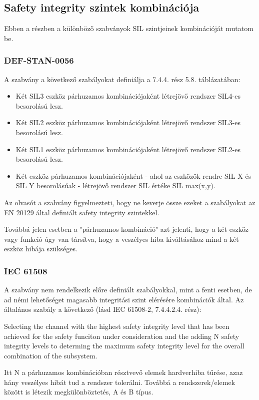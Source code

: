 \subsection{Safety integrity szintek kombinációja}
Ebben a részben a különböző szabványok SIL szintjeinek kombinációját mutatom be.

\subsubsection{DEF-STAN-0056}
A szabvány a következő szabályokat definiálja a 7.4.4. rész 5.8. táblázatában:
\begin{itemize}
	\item Két SIL3 eszköz párhuzamos kombinációjaként létrejövő rendszer SIL4-es besorolású lesz.
	\item Két SIL2 eszköz párhuzamos kombinációjaként létrejövő rendszer SIL3-es besorolású lesz.
	\item Két SIL1 eszköz párhuzamos kombinációjaként létrejövő rendszer SIL2-es besorolású lesz.
	\item Két eszköz párhuzamos kombinációjaként - ahol az eszközök rendre SIL X és SIL Y besorolásúak - létrejövő rendszer SIL értéke SIL max(x,y).
\end{itemize}

Az olvasót a szabvány figyelmezteti, hogy ne keverje össze ezeket a szabályokat az EN 20129\cite{EN50129} által definiált safety integrity szintekkel.

Továbbá jelen esetben a "párhuzamos kombináció" azt jelenti, hogy a két eszköz vagy funkció úgy van társítva, hogy a veszélyes hiba kiváltásához mind a két eszköz hibája szükséges.

\subsubsection{IEC 61508}
A szabvány nem rendelkezik előre definiált szabályokkal, mint a fenti esetben, de ad némi lehetőséget magasabb integritási szint elérésére kombinációk által.
Az általános szabály a következő (lásd IEC 61508-2, 7.4.4.2.4. rész):
\begin{center}
	Selecting the channel with the highest safety integrity level that has been achieved for the safety funciton under consideration and the adding N safety integrity levels to determing the maximum safety integrity level for the overall combination of the subsystem.
\end{center}

Itt N a párhuzamos kombinációban résztvevő elemek hardverhiba tűrése, azaz hány veszélyes hibát tud a rendszer tolerálni.
Továbbá a rendszerek/elemek között is létezik megkülönböztetés, A és B típus. 

